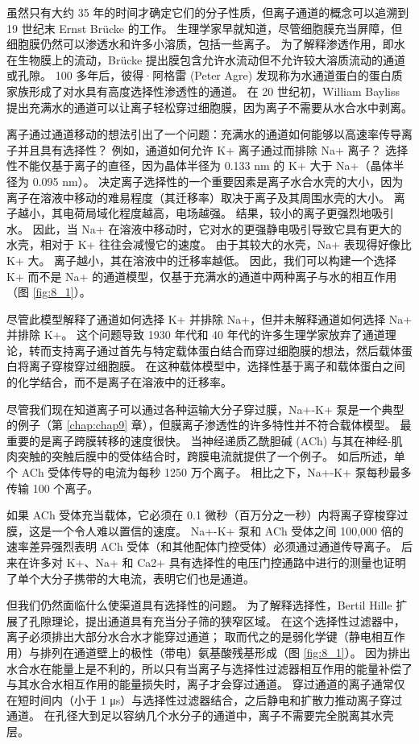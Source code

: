 虽然只有大约 35 年的时间才确定它们的分子性质，但离子通道的概念可以追溯到 19 世纪末 Ernst Brücke 的工作。 
生理学家早就知道，尽管细胞膜充当屏障，但细胞膜仍然可以渗透水和许多小溶质，包括一些离子。 
为了解释渗透作用，即水在生物膜上的流动，Brücke 提出膜包含允许水流动但不允许较大溶质流动的通道或孔隙。 
100 多年后，彼得·阿格雷 (Peter Agre) 发现称为水通道蛋白的蛋白质家族形成了对水具有高度选择性渗透性的通道。 
在 20 世纪初，William Bayliss 提出充满水的通道可以让离子轻松穿过细胞膜，因为离子不需要从水合水中剥离。


离子通过通道移动的想法引出了一个问题：充满水的通道如何能够以高速率传导离子并且具有选择性？ 
例如，通道如何允许 K+ 离子通过而排除 Na+ 离子？ 
选择性不能仅基于离子的直径，因为晶体半径为 0.133 nm 的 K+ 大于 Na+（晶体半径为 0.095 nm）。 
决定离子选择性的一个重要因素是离子水合水壳的大小，因为离子在溶液中移动的难易程度（其迁移率）取决于离子及其周围水壳的大小。 
离子越小，其电荷局域化程度越高，电场越强。 
结果，较小的离子更强烈地吸引水。 
因此，当 Na+ 在溶液中移动时，它对水的更强静电吸引导致它具有更大的水壳，相对于 K+ 往往会减慢它的速度。 
由于其较大的水壳，Na+ 表现得好像比 K+ 大。 离子越小，其在溶液中的迁移率越低。 
因此，我们可以构建一个选择 K+ 而不是 Na+ 的通道模型，仅基于充满水的通道中两种离子与水的相互作用（图 \ref{fig:8_1}）。


尽管此模型解释了通道如何选择 K+ 并排除 Na+，但并未解释通道如何选择 Na+ 并排除 K+。 
这个问题导致 1930 年代和 40 年代的许多生理学家放弃了通道理论，转而支持离子通过首先与特定载体蛋白结合而穿过细胞膜的想法，然后载体蛋白将离子穿梭穿过细胞膜。 
在这种载体模型中，选择性基于离子和载体蛋白之间的化学结合，而不是离子在溶液中的迁移率。


尽管我们现在知道离子可以通过各种运输大分子穿过膜，Na+-K+ 泵是一个典型的例子（第 \ref{chap:chap9} 章），但膜离子渗透性的许多特性并不符合载体模型。 
最重要的是离子跨膜转移的速度很快。 
当神经递质乙酰胆碱 (ACh) 与其在神经-肌肉突触的突触后膜中的受体结合时，跨膜电流就提供了一个例子。 
如后所述，单个 ACh 受体传导的电流为每秒 1250 万个离子。 
相比之下，Na+-K+ 泵每秒最多传输 100 个离子。


如果 ACh 受体充当载体，它必须在 0.1 微秒（百万分之一秒）内将离子穿梭穿过膜，这是一个令人难以置信的速度。 
Na+-K+ 泵和 ACh 受体之间 100,000 倍的速率差异强烈表明 ACh 受体（和其他配体门控受体）必须通过通道传导离子。 
后来在许多对 K+、Na+ 和 Ca2+ 具有选择性的电压门控通路中进行的测量也证明了单个大分子携带的大电流，表明它们也是通道。

但我们仍然面临什么使渠道具有选择性的问题。 
为了解释选择性，Bertil Hille 扩展了孔隙理论，提出通道具有充当分子筛的狭窄区域。 
在这个选择性过滤器中，离子必须排出大部分水合水才能穿过通道； 取而代之的是弱化学键（静电相互作用）与排列在通道壁上的极性（带电）氨基酸残基形成（图 \ref{fig:8_1}）。 
因为排出水合水在能量上是不利的，所以只有当离子与选择性过滤器相互作用的能量补偿了与其水合水相互作用的能量损失时，离子才会穿过通道。 
穿过通道的离子通常仅在短时间内（小于 1 μs）与选择性过滤器结合，之后静电和扩散力推动离子穿过通道。 
在孔径大到足以容纳几个水分子的通道中，离子不需要完全脱离其水壳层。


